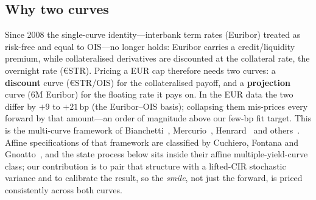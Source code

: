 \documentclass[11pt]{article}
\newcommand{\bp}{\,\text{bp}}
\begin{document}
\subsection{Why two curves}
Since 2008 the single-curve identity---interbank term rates (Euribor) treated as risk-free and equal
to OIS---no longer holds: Euribor carries a credit/liquidity premium, while collateralised
derivatives are discounted at the collateral rate, the overnight rate (€STR). Pricing a EUR cap therefore needs
two curves: a \textbf{discount} curve (€STR/OIS) for the collateralised payoff, and a
\textbf{projection} curve (6M Euribor) for the floating rate it pays on. In the EUR data the two
differ by \(+9\) to \(+21\bp\) (the Euribor--OIS basis); collapsing them mis-prices every forward by
that amount---an order of magnitude above our few-bp fit target. This is the multi-curve framework
of Bianchetti~\cite{bianchetti2010}, Mercurio~\cite{mercurio2010}, Henrard~\cite{henrard2026}
and others~\cite{grbac2015}.
Affine specifications of that framework are classified by Cuchiero, Fontana and
Gnoatto~\cite{cfg2019}, and the state process below sits inside their affine multiple-yield-curve
class; our contribution is to pair that structure with a lifted-CIR stochastic variance and to
calibrate the result, so the \emph{smile}, not just the forward, is priced consistently across
both curves.
\end{document}
